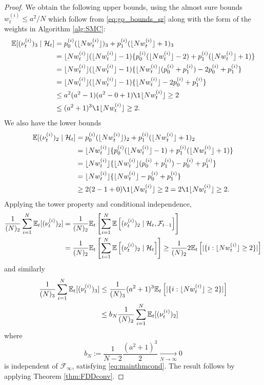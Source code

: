 \begin{proof}
We obtain the following upper bounds, using the almost sure bounds $w_t^{(i)} \leq a^2/N$ which follow from \eqref{eq:gq_bounds_sr} along with the form of the weights in Algorithm \ref{alg:SMC}:
\begin{align*}
\E[(\nu_t^{(i)})_3 \mid \mathcal{H}_t] &= p_0^{(i)} (\flnw)_3 + p_1^{(i)} (\flnw + 1)_3 \\
&= \flnw (\flnw -1) \{ p_0^{(i)} (\flnw -2) + p_1^{(i)} (\flnw +1) \} \\
&= \flnw (\flnw -1) \{ \flnw (p_0^{(i)} + p_1^{(i)}) -2 p_0^{(i)} + p_1^{(i)} \} \\
&= \flnw (\flnw -1) \{ \flnw -2 p_0^{(i)} + p_1^{(i)} \} \\
&\leq a^2 (a^2 -1) (a^2 -0 +1) \1{\flnw \geq 2} \\
&\leq (a^2 +1)^3 \1{\flnw \geq 2} .
\end{align*}
We also have the lower bounds
\begin{align*}
\E[(\nu_t^{(i)})_2 \mid \mathcal{H}_t] &= p_0^{(i)} (\flnw)_2 + p_1^{(i)} (\flnw + 1)_2 \\
&= \flnw \{ p_0^{(i)} (\flnw -1) + p_1^{(i)} (\flnw +1) \} \\
&= \flnw \{ \flnw (p_0^{(i)} + p_1^{(i)}) - p_0^{(i)} + p_1^{(i)} \} \\
&= \flnw \{ \flnw - p_0^{(i)} + p_1^{(i)} \} \\
&\geq 2 (2 -1 +0) \1{\flnw \geq 2} = 2 \1{\flnw \geq 2} .
\end{align*}
Applying the tower property and conditional independence,
\begin{align*}
\frac{1}{(N)_2} \sum_{i=1}^N \mathbb{E}_t [( \nu_t^{(i)} )_2 ] 
&= \frac{1}{(N)_2} \mathbb{E}_t\left[ \sum_{i=1}^N \mathbb{E}\left[ (\nu_t^{(i)})_2 \mid \mathcal{H}_t, \mathcal{F}_{t-1} \right] \right] \\
&= \frac{1}{(N)_2} \mathbb{E}_t\left[ \sum_{i=1}^N \mathbb{E}\left[ (\nu_t^{(i)})_2 \mid \mathcal{H}_t \right] \right]
\geq \frac{1}{(N)_2} 2 \mathbb{E}_t\left[ |\{i:\lfloor N w_t^{(i)} \rfloor\geq 2\}| \right] 
\end{align*}
and similarly
\begin{align*}
\frac{1}{(N)_3} \sum_{i=1}^N \mathbb{E}_t [( \nu_t^{(i)} )_3 ] 
&\leq \frac{1}{(N)_3}  (a^2+1)^3 \mathbb{E}_t\left[ |\{i:\lfloor N w_t^{(i)} \rfloor\geq 2\}| \right] \\
&\leq b_N  \frac{1}{(N)_2} \sum_{i=1}^N \mathbb{E}_t [( \nu_t^{(i)} )_2 ]
\end{align*}
where
\begin{equation*}
b_N := \frac{1}{N-2}\frac{(a^2+1)^3}{2} \underset{N\to\infty}{\longrightarrow} 0
\end{equation*}
is independent of $\mathcal{F}_\infty$, satisfying \eqref{eq:mainthmcond}.
The result follows by applying Theorem \ref{thm:FDDconv}.
\end{proof}

